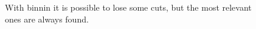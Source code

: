 \documentclass{PoliMi_MasterThesis}
\begin{document}
\begin{figure}[H]
    \centering
	\qquad
	\caption{With binnin it is possible to lose some cuts, but the most relevant ones are always found.}
    \label{fig:triangles_splitting_binning}
\end{figure}
\end{document}
